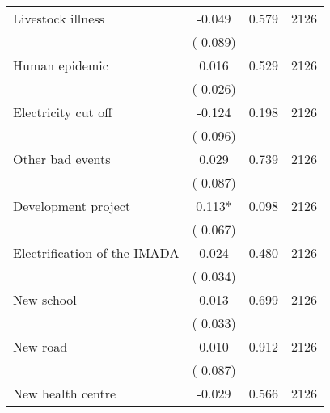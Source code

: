 \begin{tabular}{l*{3}{c}}
 Livestock illness                 &             -0.049          &        0.579 & 2126          \\ 
                               &        (       0.089)             &                        &                              \\ 
 Human epidemic                &              0.016        &        0.529   & 2126              \\ 
                               &        (       0.026)            &                               &                               \\ 
 Electricity cut off                &             -0.124        &        0.198   & 2126              \\ 
                               &        (       0.096)            &                               &                               \\ 
 Other bad events                &              0.029        &        0.739   & 2126              \\ 
                               &        (       0.087)            &                               &                               \\ 
 Development project                &              0.113*        &        0.098   & 2126              \\ 
                               &        (       0.067)            &                               &                               \\ 
 Electrification of the IMADA                &              0.024        &        0.480   & 2126              \\ 
                               &        (       0.034)            &                               &                               \\ 
 New school                &              0.013        &        0.699   & 2126              \\ 
                               &        (       0.033)            &                               &                               \\ 
 New road                &              0.010        &        0.912   & 2126              \\ 
                               &        (       0.087)            &                               &                               \\ 
 New health centre                &             -0.029        &        0.566   & 2126              \\ 

\end{tabular}
